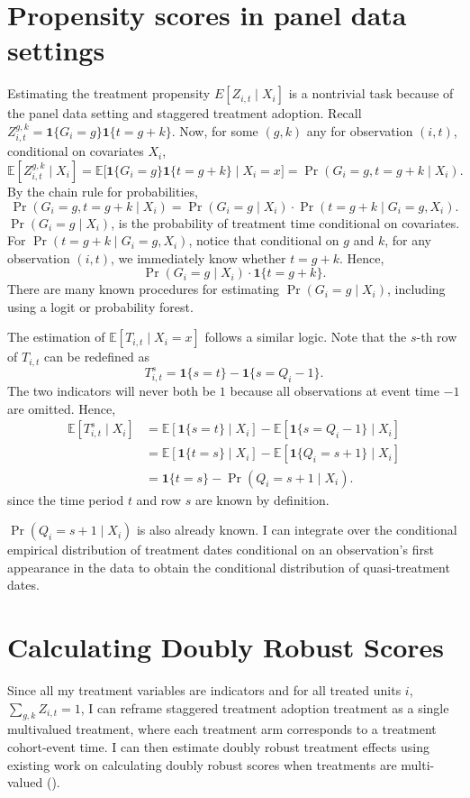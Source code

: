 \documentclass[12pt,notitlepage]{article}
\newcommand{\E}{\mathbb{E}}
\begin{document}
\section{Propensity scores in panel data settings}\label{sec:treatment_propensity}
Estimating the treatment propensity $E[Z_{i,t} \mid X_i]$ is a nontrivial task because of the panel data setting and staggered treatment adoption. 
Recall $Z_{i,t}^{g,k}=\mathbf{1}\{G_i=g\}\mathbf{1}\{t=g+k\}$. 
Now, for some $(g, k)$ any for observation $(i, t)$, conditional on covariates $X_i$, 
$$
\E[Z_{i,t}^{g,k}\mid X_i]
= \E\big[\mathbf{1}\{G_i=g\}\mathbf{1}\{t=g+k\}\mid X_i=x\big]
= \Pr(G_i=g, t=g+k \mid X_i).
$$
By the chain rule for probabilities,
$$
\Pr(G_i=g, t=g+k \mid X_i)
=\Pr(G_i=g\mid X_i)\cdot \Pr(t=g+k \mid G_i=g, X_i).
$$
$\Pr(G_i=g\mid X_i)$, is the probability of treatment time conditional on covariates. 
For $\Pr(t=g+k \mid G_i=g, X_i)$, notice that conditional on $g$ and $k$, for any observation $(i, t)$, we immediately know whether $t = g+k$. 
Hence, 
$$\Pr(G_i=g\mid X_i)\cdot \mathbf{1}\{t=g+k\}.$$
There are many known procedures for estimating $\Pr(G_i=g\mid X_i)$, including using a logit or probability forest. 

The estimation of $\E[T_{i,t}\mid X_i=x]$ follows a similar logic. 
Note that the $s$-th row of $T_{i,t}$ can be redefined as
\begin{equation*}
    T_{i,t}^s = \mathbf{1}\{s=t\} - \mathbf{1}\{s = Q_i - 1\}.
\end{equation*}
The two indicators will never both be $1$ because all observations at event time $-1$ are omitted. 
Hence, 
\begin{align*}
\E[T_{i,t}^s \mid X_i] 
&= \E[\mathbf{1}\{s = t\} \mid X_i] - \E[\mathbf{1}\{s = Q_i - 1\} \mid X_i] \\[4pt]
&= \E[\mathbf{1}\{t = s\} \mid X_i] - \E[\mathbf{1}\{Q_i = s + 1\} \mid X_i] \\[4pt]
&= \mathbf{1}\{t = s\} - \Pr(Q_i = s + 1 \mid X_i).
\end{align*}
since the time period $t$ and row $s$ are known by definition. 

$\Pr(Q_i = s + 1 \mid X_i)$ is also already known. 
I can integrate over the conditional empirical distribution of treatment dates conditional on an observation's first appearance in the data to obtain the conditional distribution of quasi-treatment dates. 

\section{Calculating Doubly Robust Scores} \label{sec:doubly_robust}
Since all my treatment variables are indicators and for all treated units $i$, $\sum_{g, k}Z_{i, t} = 1$, I can reframe staggered treatment adoption treatment as a single multivalued treatment, where each treatment arm corresponds to a treatment cohort-event time. 
I can then estimate doubly robust treatment effects using existing work on calculating doubly robust scores when treatments are multi-valued (\citealt{uysal_dr_2015}).
\end{document}
